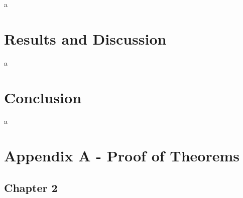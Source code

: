 \documentclass[a4paper,11pt]{book}
\numberwithin{figure}{chapter}
\numberwithin{equation}{chapter}
\numberwithin{table}{chapter}
\theoremstyle{definition}
\begin{document}
a

\clearpage
\chapter{Results and Discussion}

a

\clearpage
\chapter{Conclusion}

a

\clearpage
{}




\clearpage
{}
\chapter*{Appendix A - Proof of Theorems}

\section*{Chapter 2}
\end{document}
